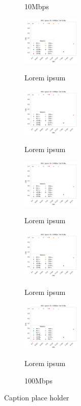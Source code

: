 \documentclass[a4paper,fleqn]{cas-sc}
\begin{document}
\begin{center}
\begin{figure}
\begin{subfigure}[b]{0.45\textwidth}
		\caption{10Mbps}
	
		\end{subfigure}

	\begin{subfigure}[b]{0.45\textwidth}
		\includegraphics[width=0.3\textwidth]{./figs/ROC-Space-Test-Data-10Mbps.png}		
		\caption{Lorem ipsum}
		\quad
		\includegraphics[width=0.3\textwidth]{./figs/ROC-Space-Test-Data-10Mbps.png}
		\caption{Lorem ipsum}
		\quad
		\includegraphics[width=0.3\textwidth]{./figs/ROC-Space-Test-Data-10Mbps.png}
		\caption{Lorem ipsum}
		
		\includegraphics[width=0.3\textwidth]{./figs/ROC-Space-Test-Data-10Mbps.png}
		\caption{Lorem ipsum}
		\quad
		\includegraphics[width=0.3\textwidth]{./figs/ROC-Space-Test-Data-10Mbps.png}
		\caption{Lorem ipsum}
	
	\caption{100Mbps}
	
\end{subfigure}


		\caption{Caption place holder}

\end{figure}


\end{center}
\end{document}
